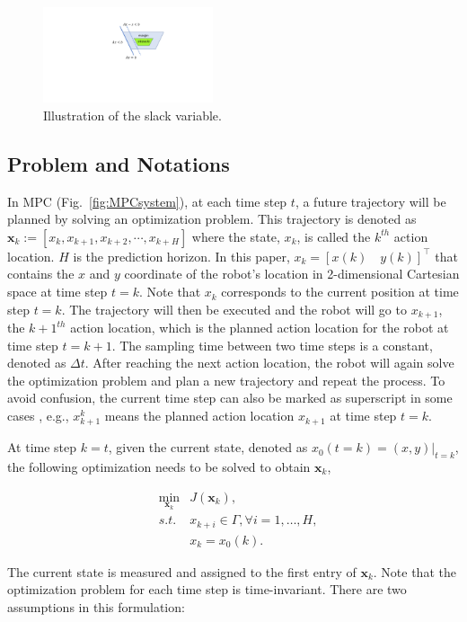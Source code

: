 \documentclass[letterpaper, 10 pt, conference]{ieeeconf}  %
\begin{document}
\begin{figure}[t]
      \centering
      \includegraphics[width=5cm]{plot/slack.pdf}
      \caption{Illustration of the slack variable. }
      \label{fig:slack}
\end{figure}

\subsection{Problem and Notations}
In MPC (Fig.~\ref{fig:MPCsystem}), at each time step $t$, a future trajectory will be planned by solving an optimization problem. This trajectory is denoted as $\mathbf{x}_{k} := [x_k, x_{k+1},x_{k+2},\cdots,x_{k+H}]$ where the state, $x_k$, is called the $k^{th}$ action location. $H$ is the prediction horizon. In this paper, $x_k= [x(k)\quad y(k)]^{\intercal}$ that contains the $x$ and $y$ coordinate of the robot's location in 2-dimensional Cartesian space at time step $t=k$. Note that $x_k$ corresponds to the current position at time step $t=k$. The trajectory will then be executed and the robot will go to $x_{k+1}$, the $k+1^{th}$ action location, which is the planned action location for the robot at time step $t=k+1$. The sampling time between two time steps is a constant, denoted as $\Delta t$. After reaching the next action location, the robot will again solve the optimization problem and plan a new trajectory and repeat the process. To avoid confusion, the current time step can also be marked as superscript in some cases , e.g., $x_{k+1}^k$ means the planned action location $x_{k+1}$ at time step $t=k$.

At time step $k=t$, given the current state, denoted as $x_0(t=k) = (x,y)|_{t=k}$, the following optimization needs to be solved to obtain $\mathbf{x}_k$,


\begin{eqnarray}
&\min_{\mathbf{x}_{k}} & J(\mathbf{x}_k),\\
&s.t.& x_{k+i}\in\Gamma,\forall i=1,\ldots,H,\\
&&         x_{k}=x_0(k).
\end{eqnarray}

The current state is measured and assigned to the first entry of $\mathbf{x}_{k}$. Note that the optimization problem for each time step is time-invariant. There are two assumptions in this formulation: 
\end{document}
